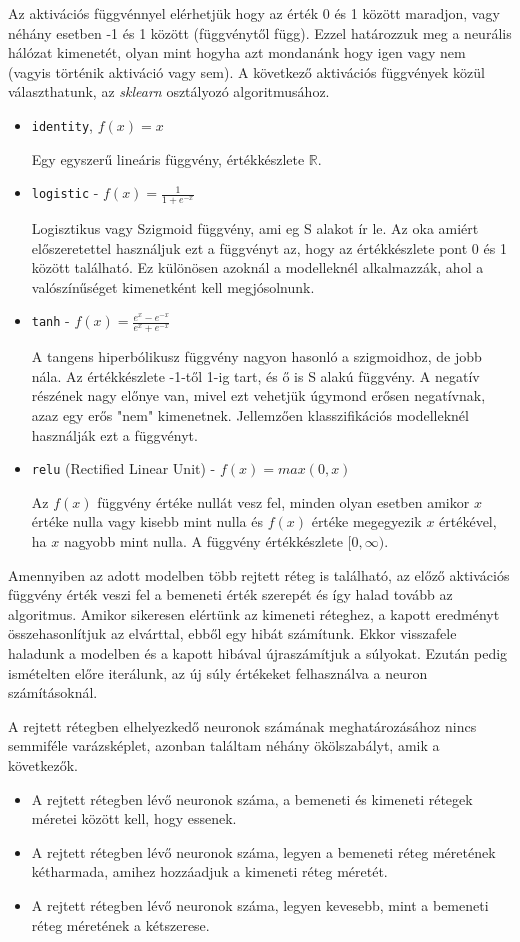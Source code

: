 Az aktivációs függvénnyel elérhetjük hogy az érték 0 és 1 között maradjon, vagy néhány esetben -1 és 1 között (függvénytől függ). Ezzel határozzuk meg a neurális hálózat kimenetét, olyan mint hogyha azt mondanánk hogy igen vagy nem (vagyis történik aktiváció vagy sem). 
A következő aktivációs függvények közül választhatunk, az \textit{sklearn} osztályozó algoritmusához.
\begin{itemize}
\item \texttt{identity}, $f(x) = x$

Egy egyszerű lineáris függvény, értékkészlete $\mathbb{R}$.
\item \texttt{logistic} - $f(x) = \frac{1}{1+e^{-x}}$

Logisztikus vagy Szigmoid függvény, ami eg S alakot ír le. Az oka amiért előszeretettel használjuk ezt a függvényt az, hogy az értékkészlete pont 0 és 1 között található. Ez különösen azoknál a modelleknél alkalmazzák, ahol a valószínűséget kimenetként kell megjósolnunk.
\item \texttt{tanh} - $f(x) = \frac{e^{x}-e^{-x}}{e^{x}+e^{-x}}$

A tangens hiperbólikusz függvény nagyon hasonló a szigmoidhoz, de jobb nála. Az értékkészlete -1-től 1-ig tart, és ő is S alakú függvény.
A negatív részének nagy előnye van, mivel ezt vehetjük úgymond erősen negatívnak, azaz egy erős "nem" kimenetnek. Jellemzően klasszifikációs modelleknél használják ezt a függvényt.
\item \texttt{relu} (Rectified Linear Unit) - $f(x) = max(0,x)$

Az $f(x)$ függvény értéke nullát vesz fel, minden olyan esetben amikor $x$ értéke nulla vagy kisebb mint nulla és $f(x)$ értéke megegyezik $x$ értékével, ha $x$ nagyobb mint nulla.
A függvény értékkészlete $[0,\infty)$.
\end{itemize}

Amennyiben az adott modelben több rejtett réteg is található, az előző aktivációs függvény érték veszi fel a bemeneti érték szerepét és így halad tovább az algoritmus. Amikor sikeresen elértünk az kimeneti réteghez, a kapott eredményt összehasonlítjuk az elvárttal, ebből egy hibát számítunk.
Ekkor visszafele haladunk a modelben és a kapott hibával újraszámítjuk a súlyokat.
Ezután pedig ismételten előre iterálunk, az új súly értékeket felhasználva a neuron számításoknál.

A rejtett rétegben elhelyezkedő neuronok számának meghatározásához nincs semmiféle varázsképlet, azonban találtam néhány ökölszabályt, amik a következők. 
\begin{itemize}
\item A rejtett rétegben lévő neuronok száma, a bemeneti és kimeneti rétegek méretei között kell, hogy essenek.
\item A rejtett rétegben lévő neuronok száma, legyen a bemeneti réteg méretének kétharmada, amihez hozzáadjuk a kimeneti réteg méretét.
\item A rejtett rétegben lévő neuronok száma, legyen kevesebb, mint a bemeneti réteg méretének a kétszerese.
\end{itemize}

